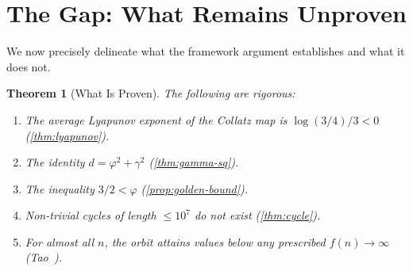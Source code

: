 \documentclass[11pt,a4paper]{article}
\newtheorem{theorem}{Theorem}[section]
\theoremstyle{definition}
\newcommand{\gam}{\gamma}
\begin{document}
\section{The Gap: What Remains Unproven}\label{sec:gap}

We now precisely delineate what the framework argument establishes and what it
does not.

\begin{theorem}[What Is Proven]\label{thm:proven}
The following are rigorous:
\begin{enumerate}[nosep,label=(\roman*)]
  \item The average Lyapunov exponent of the Collatz map is
    $\log(3/4)/3 < 0$ (\cref{thm:lyapunov}).
  \item The identity $d = \varphi^2 + \gam^2$ (\cref{thm:gamma-sq}).
  \item The inequality $3/2 < \varphi$ (\cref{prop:golden-bound}).
  \item Non-trivial cycles of length $\leq 10^7$ do not exist
    (\cref{thm:cycle}).
  \item For almost all $n$, the orbit attains values below any prescribed
    $f(n) \to \infty$ (Tao~\cite{tao}).
\end{enumerate}
\end{theorem}
\end{document}
